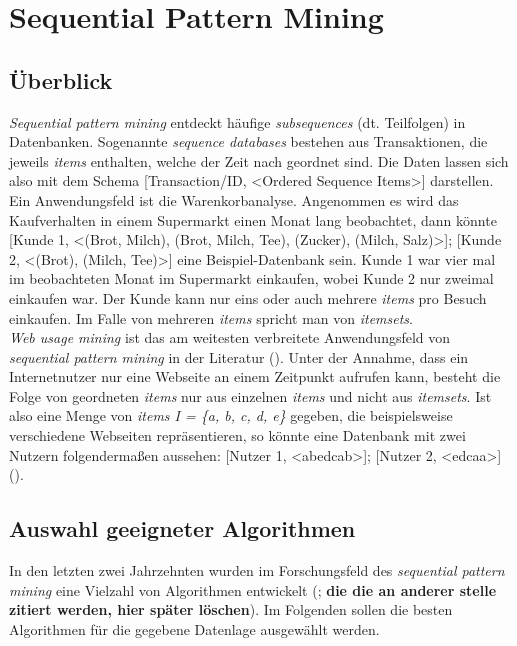\section{Sequential Pattern Mining}\label{spm}

\subsection{Überblick}

\textit{Sequential pattern mining} entdeckt häufige \textit{subsequences} (dt. Teilfolgen) in Datenbanken. Sogenannte \textit{sequence databases} bestehen aus Transaktionen, die jeweils \textit{items} enthalten, welche der Zeit nach geordnet sind. Die Daten lassen sich also mit dem Schema [Transaction/ID, <Ordered Sequence Items>] darstellen.\\
Ein Anwendungsfeld ist die Warenkorbanalyse. Angenommen es wird das Kaufverhalten in einem Supermarkt einen Monat lang beobachtet, dann könnte [Kunde 1, <(Brot, Milch), (Brot, Milch, Tee), (Zucker), (Milch, Salz)>]; [Kunde 2, <(Brot), (Milch, Tee)>] eine Beispiel-Datenbank sein. Kunde 1 war vier mal im beobachteten Monat im Supermarkt einkaufen, wobei Kunde 2 nur zweimal einkaufen war. Der Kunde kann nur eins oder auch mehrere \textit{items} pro Besuch einkaufen. Im Falle von mehreren \textit{items} spricht man von \textit{itemsets}.\\
\textit{Web usage mining} ist das am weitesten verbreitete Anwendungsfeld von \textit{sequential pattern mining} in der Literatur (\cite{lu_ezeife,wang_han,goethals}). Unter der Annahme, dass ein Internetnutzer nur eine Webseite an einem Zeitpunkt aufrufen kann, besteht die Folge von geordneten \textit{items} nur aus einzelnen \textit{items} und nicht aus \textit{itemsets}. Ist also eine Menge von \textit{items I = \{a, b, c, d, e\}} gegeben, die beispielsweise verschiedene Webseiten repräsentieren, so könnte eine Datenbank mit zwei Nutzern folgendermaßen aussehen: [Nutzer 1, <abedcab>]; [Nutzer 2, <edcaa>] (\cite[3:1-3:2]{taxonomy}).

\subsection{Auswahl geeigneter Algorithmen}

In den letzten zwei Jahrzehnten wurden im Forschungsfeld des \textit{sequential pattern mining} eine Vielzahl von Algorithmen entwickelt (\cite{hvsm,lapin,aprioriall,gsp,psp,spam,freespan,prefixspan,wapmine,fsminer,discall,spade,plwap}; \textbf{die die an anderer stelle zitiert werden, hier später löschen}). Im Folgenden sollen die besten Algorithmen für die gegebene Datenlage ausgewählt werden.
